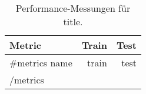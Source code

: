 \begin{table}[ht]
  \centering
  \caption{Performance-Messungen für {{title}}. }

  \begin{tabular}{lrr}
    \toprule
    Metric & Train & Test \\
    \midrule
    {{#metrics}}
      {{name}} & {{train}} & {{test}} \\
    {{/metrics}}
    \bottomrule
  \end{tabular}
\end{table}
